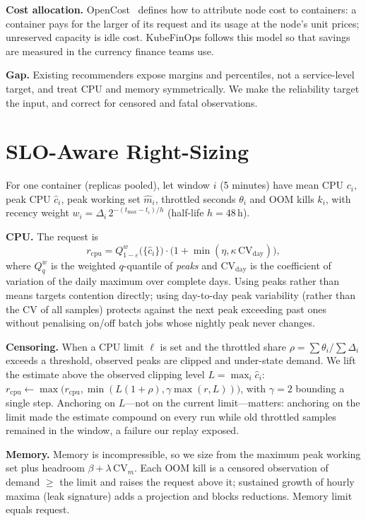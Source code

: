 \documentclass[conference]{IEEEtran}
\begin{document}
\textbf{Cost allocation.} OpenCost~\cite{opencost} defines how to attribute node cost to containers: a container
pays for the larger of its request and its usage at the node's unit prices; unreserved capacity is idle cost.
KubeFinOps follows this model so that savings are measured in the currency finance teams use.

\textbf{Gap.} Existing recommenders expose margins and percentiles, not a service-level target, and treat CPU and
memory symmetrically. We make the reliability target the input, and correct for censored and fatal observations.

\section{SLO-Aware Right-Sizing}\label{sec:method}
For one container (replicas pooled), let window $i$ (5 minutes) have mean CPU $c_i$, peak CPU $\hat c_i$, peak
working set $\hat m_i$, throttled seconds $\theta_i$ and OOM kills $k_i$, with recency weight
$w_i = \Delta_i \, 2^{-(t_{\max}-t_i)/h}$ (half-life $h = 48$\,h).

\textbf{CPU.} The request is
\begin{equation}
r_{\mathrm{cpu}} = Q^{w}_{1-\varepsilon}\big(\{\hat c_i\}\big)\cdot\big(1 + \min(\eta, \kappa\,\mathrm{CV}_{\mathrm{day}})\big),
\end{equation}
where $Q^w_q$ is the weighted $q$-quantile of \emph{peaks} and $\mathrm{CV}_{\mathrm{day}}$ is the coefficient of
variation of the daily maximum over complete days. Using peaks rather than means targets contention directly;
using day-to-day peak variability (rather than the CV of all samples) protects against the next peak exceeding
past ones without penalising on/off batch jobs whose nightly peak never changes.

\textbf{Censoring.} When a CPU limit $\ell$ is set and the throttled share
$\rho = \sum\theta_i / \sum\Delta_i$ exceeds a threshold, observed peaks are clipped and under-state demand. We
lift the estimate above the observed clipping level $L = \max_i \hat c_i$:
$r_{\mathrm{cpu}} \leftarrow \max\big(r_{\mathrm{cpu}}, \min(L(1+\rho), \gamma\max(r, L))\big)$, with $\gamma = 2$
bounding a single step. Anchoring on $L$---not on the current limit---matters: anchoring on the limit made the
estimate compound on every run while old throttled samples remained in the window, a failure our replay exposed.

\textbf{Memory.} Memory is incompressible, so we size from the maximum peak working set plus headroom
$\beta + \lambda\,\mathrm{CV}_m$. Each OOM kill is a censored observation of demand $\geq$ the limit and raises the
request above it; sustained growth of hourly maxima (leak signature) adds a projection and blocks reductions.
Memory limit equals request.
\end{document}
